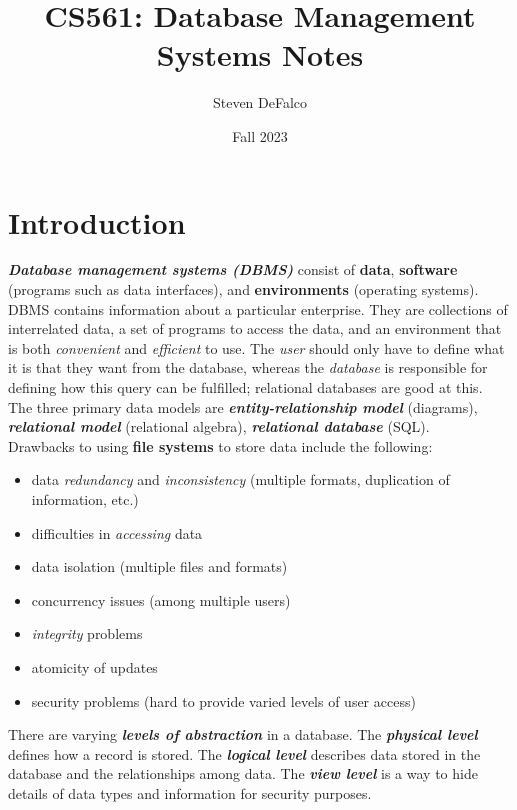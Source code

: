 \documentclass{article}
\title{CS561: Database Management Systems Notes}
\author{Steven DeFalco}
\date{Fall 2023}
\newcommand{\bold}[1]{\textbf{#1}}
\newcommand{\define}[1]{\textbf{\textit{#1}}}
\begin{document}
\maketitle
\tableofcontents
\newpage



\section{Introduction}

\define{Database management systems (DBMS)} consist of \bold{data}, \bold{software} (programs such as data interfaces), and \bold{environments} (operating systems). DBMS contains information about a particular enterprise. They are collections of interrelated data, a set of programs to access the data, and an environment that is both \emph{convenient} and \emph{efficient} to use. The \emph{user} should only have to define what it is that they want from the database, whereas the \emph{database} is responsible for defining how this query can be fulfilled; relational databases are good at this. \\

The three primary data models are \define{entity-relationship model} (diagrams), \define{relational model} (relational algebra), \define{relational database} (SQL). \\

Drawbacks to using \bold{file systems} to store data include the following: 

\begin{itemize}
  \item data \emph{redundancy} and \emph{inconsistency} (multiple formats, duplication of information, etc.)
  \item difficulties in \emph{accessing} data 
  \item data isolation (multiple files and formats) 
  \item concurrency issues (among multiple users)
  \item \emph{integrity} problems 
  \item atomicity of updates
  \item security problems (hard to provide varied levels of user access)
\end{itemize}

There are varying \define{levels of abstraction} in a database. The \define{physical level} defines how a record is stored. The \define{logical level} describes data stored in the database and the relationships among data. The \define{view level} is a way to hide details of data types and information for security purposes. \\ 
\end{document}
